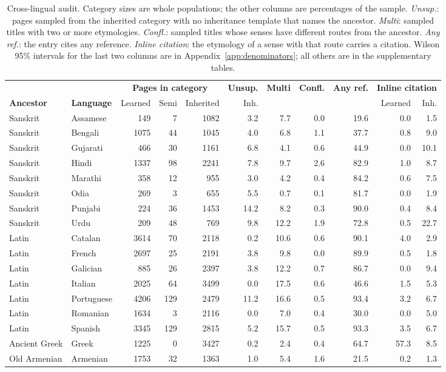 \documentclass[11pt]{article}
\begin{document}
\begin{table}[t]
\centering\small
\begin{tabular}{llrrrrrrrrr}
\toprule
& & \multicolumn{3}{c}{\textbf{Pages in category}} & \textbf{Unsup.} & \textbf{Multi} & \textbf{Confl.} & \textbf{Any ref.} & \multicolumn{2}{c}{\textbf{Inline citation}} \\
\textbf{Ancestor} & \textbf{Language} & Learned & Semi & Inherited & Inh. & & & & Learned & Inh. \\
\midrule
Sanskrit & Assamese & 149 & 7 & 1082 & 3.2 & 7.7 & 0.0 & 19.6 & 0.0 & 1.5 \\
Sanskrit & Bengali & 1075 & 44 & 1045 & 4.0 & 6.8 & 1.1 & 37.7 & 0.8 & 9.0 \\
Sanskrit & Gujarati & 466 & 30 & 1161 & 6.8 & 4.1 & 0.6 & 44.9 & 0.0 & 10.1 \\
Sanskrit & Hindi & 1337 & 98 & 2241 & 7.8 & 9.7 & 2.6 & 82.9 & 1.0 & 8.7 \\
Sanskrit & Marathi & 358 & 12 & 955 & 3.0 & 4.2 & 0.4 & 84.2 & 0.6 & 7.5 \\
Sanskrit & Odia & 269 & 3 & 655 & 5.5 & 0.7 & 0.1 & 81.7 & 0.0 & 1.9 \\
Sanskrit & Punjabi & 224 & 36 & 1453 & 14.2 & 8.2 & 0.3 & 90.0 & 0.4 & 8.4 \\
Sanskrit & Urdu & 209 & 48 & 769 & 9.8 & 12.2 & 1.9 & 72.8 & 0.5 & 22.7 \\
\midrule
Latin & Catalan & 3614 & 70 & 2118 & 0.2 & 10.6 & 0.6 & 90.1 & 4.0 & 2.9 \\
Latin & French & 2697 & 25 & 2191 & 3.8 & 9.8 & 0.0 & 89.9 & 0.5 & 1.8 \\
Latin & Galician & 885 & 26 & 2397 & 3.8 & 12.2 & 0.7 & 86.7 & 0.0 & 9.4 \\
Latin & Italian & 2025 & 64 & 3499 & 0.0 & 17.5 & 0.6 & 46.6 & 1.5 & 5.3 \\
Latin & Portuguese & 4206 & 129 & 2479 & 11.2 & 16.6 & 0.5 & 93.4 & 3.2 & 6.7 \\
Latin & Romanian & 1634 & 3 & 2116 & 0.0 & 7.0 & 0.4 & 30.0 & 0.0 & 5.0 \\
Latin & Spanish & 3345 & 129 & 2815 & 5.2 & 15.7 & 0.5 & 93.3 & 3.5 & 6.7 \\
\midrule
Ancient Greek & Greek & 1225 & 0 & 3427 & 0.2 & 2.4 & 0.4 & 64.7 & 57.3 & 8.5 \\
\midrule
Old Armenian & Armenian & 1753 & 32 & 1363 & 1.0 & 5.4 & 1.6 & 21.5 & 0.2 & 1.3 \\
\bottomrule
\end{tabular}
\caption{Cross-lingual audit. Category sizes are whole populations; the other columns are percentages of the sample. \textit{Unsup.}: pages sampled from the inherited category with no inheritance template that names the ancestor. \textit{Multi}: sampled titles with two or more etymologies. \textit{Confl.}: sampled titles whose senses have different routes from the ancestor. \textit{Any ref.}: the entry cites any reference. \textit{Inline citation}: the etymology of a sense with that route carries a citation. Wilson 95\% intervals for the last two columns are in Appendix~\ref{app:denominators}; all others are in the supplementary tables.}
\label{tab:audit}
\end{table}
\end{document}
